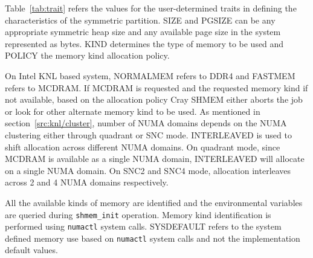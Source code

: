 Table~\ref{tab:trait} refers the values for the user-determined traits
in defining the characteristics of the symmetric partition. SIZE and PGSIZE
can be any appropriate symmetric heap size and any available page size in
the system represented as bytes. KIND determines the type of memory to be
used and POLICY the memory kind allocation policy.

On Intel KNL based system, NORMALMEM refers to DDR4 and FASTMEM refers to
MCDRAM. If MCDRAM is requested and the requested memory kind if not available,
based on the allocation policy Cray SHMEM either aborts the job or look for
other alternate memory kind to be used. As mentioned in
section~\ref{src:knl/cluster}, number of NUMA domains depends on the NUMA
clustering either through quadrant or SNC mode. INTERLEAVED is used to shift
allocation across different NUMA domains. On quadrant mode, since MCDRAM is
available as a single NUMA domain, INTERLEAVED will allocate on a single
NUMA domain. On SNC2 and SNC4 mode, allocation interleaves across 2 and 4
NUMA domains respectively.

All the available kinds of memory are identified and the environmental
variables are queried during \texttt{shmem\_init} operation. Memory kind
identification is performed using \texttt{numactl} system calls. SYSDEFAULT
refers to the system defined memory use based on \texttt{numactl} system
calls and not the implementation default values.
